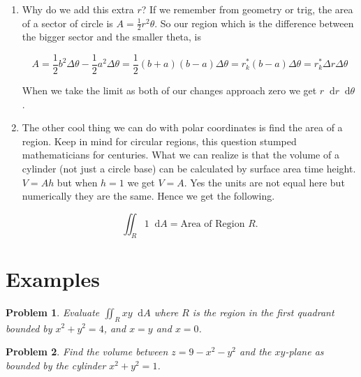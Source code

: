 \documentclass[11pt]{article}
\newtheorem{problem}{Problem}
\newcommand*\dif{\mathop{}\!\mathrm{d}}
\begin{document}
\begin{enumerate}
\item Why do we add this extra $r$? If we remember from geometry or trig, the area of a sector of circle is $A = \frac{1}{2}r^2 \theta$. So our region which is the difference between the bigger sector and the smaller theta, is

\begin{equation*}
    A = \frac{1}{2}b^2 \Delta \theta - \frac{1}{2}a^2 \Delta \theta = \frac{1}{2}(b+a)(b-a)\Delta \theta = r_k^* (b-a) \Delta \theta = r_k^* \Delta r \Delta \theta
\end{equation*}

When we take the limit as both of our changes approach zero we get $r\dif{r}\dif{\theta}$.

\item The other cool thing we can do with polar coordinates is find the area of a region. Keep in mind for circular regions, this question stumped mathematicians for centuries. What we can realize is that the volume of a cylinder (not just a circle base) can be calculated by surface area time height. $V = Ah$ but when $h=1$ we get $V=A$. Yes the units are not equal here but numerically they are the same. Hence we get the following.

\begin{equation*}
    \iint_R 1 \dif{A} = \text{Area of Region } R.
\end{equation*}



\end{enumerate}




\section{Examples}

\begin{problem}
    Evaluate $\iint_R xy \dif{A}$ where $R$ is the region in the first quadrant bounded by $x^2+y^2= 4$, and $x=y$ and $x=0$.
\end{problem}


\vspace{10cm}



\begin{problem}
    Find the volume between $z=9-x^2-y^2$ and the $xy$-plane as bounded by the cylinder $x^2+y^2=1$.
\end{problem}

\vspace{7cm}
\end{document}
